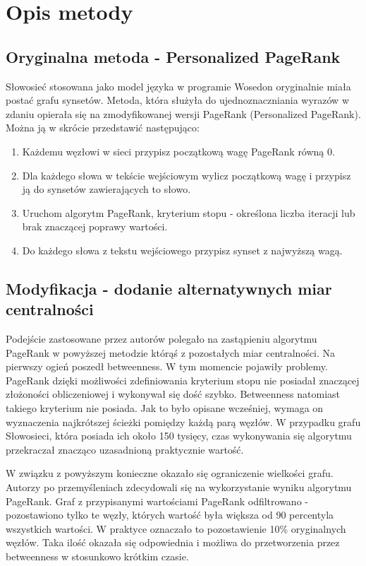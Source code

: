 \chapter{Opis metody}
\section{Oryginalna metoda - Personalized PageRank}

Słowosieć stosowana jako model języka w programie Wosedon oryginalnie miała postać grafu synsetów. Metoda, która służyła do ujednoznaczniania wyrazów w zdaniu opierała się na zmodyfikowanej wersji PageRank (Personalized PageRank). Można ją w skrócie przedstawić następująco:
\begin{enumerate}
	\item Każdemu węzłowi w sieci przypisz początkową wagę PageRank równą 0.
	\item Dla każdego słowa w tekście wejściowym wylicz początkową wagę i przypisz ją do synsetów zawierających to słowo.
	\item Uruchom algorytm PageRank, kryterium stopu - określona liczba iteracji lub brak znaczącej poprawy wartości.
	\item Do każdego słowa z tekstu wejściowego przypisz synset z najwyższą wagą.
\end{enumerate}

\section{Modyfikacja - dodanie alternatywnych miar centralności}
Podejście zastosowane przez autorów polegało na zastąpieniu algorytmu PageRank w powyższej metodzie którąś z pozostałych miar centralności. Na pierwszy ogień poszedł betweenness. W tym momencie pojawiły problemy. PageRank dzięki możliwości zdefiniowania kryterium stopu nie posiadał znaczącej złożoności obliczeniowej i wykonywał się dość szybko. Betweenness natomiast takiego kryterium nie posiada. Jak to było opisane wcześniej, wymaga on wyznaczenia najkrótszej ścieżki pomiędzy każdą parą węzłów. W przypadku grafu Słowosieci, która posiada ich około 150 tysięcy, czas wykonywania się algorytmu przekraczał znacząco uzasadnioną praktycznie wartość.

W związku z powyższym konieczne okazało się ograniczenie wielkości grafu. Autorzy po przemyśleniach zdecydowali się na wykorzystanie wyniku algorytmu PageRank. Graf z przypisanymi wartościami PageRank odfiltrowano - pozostawiono tylko te węzły, których wartość była większa od 90 percentyla wszystkich wartości. W praktyce oznaczało to pozostawienie 10\% oryginalnych węzłów. Taka ilość okazała się odpowiednia i możliwa do przetworzenia przez betweenness w stosunkowo krótkim czasie.

